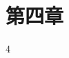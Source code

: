 \documentclass[supercite]{../upcthesis}
\begin{document}
\fi

\section{第四章}

4





\ifx\compileAllFiles\undefined
\end{document}
